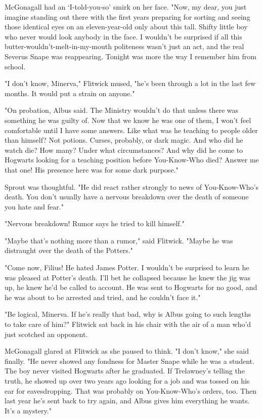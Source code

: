 McGonagall had an `I-told-you-so' smirk on her face. "Now, my dear, you just imagine standing out there with the first years preparing for sorting and seeing those identical eyes on an eleven-year-old only about this tall. Shifty little boy who never would look anybody in the face. I wouldn't be surprised if all this butter-wouldn't-melt-in-my-mouth politeness wasn't just an act, and the real Severus Snape was reappearing. Tonight was more the way I remember him from school.

"I don't know, Minerva," Flitwick mused, "he's been through a lot in the last few months. It would put a strain on anyone."

"On probation, Albus said. The Ministry wouldn't do that unless there was something he was guilty of. Now that we know he was one of them, I won't feel comfortable until I have some answers. Like what was he teaching to people older than himself? Not potions. Curses, probably, or dark magic. And who did he watch die? How many? Under what circumstances? And why did he come to Hogwarts looking for a teaching position before You-Know-Who died? Answer me that one! His presence here was for some dark purpose."

Sprout was thoughtful. "He did react rather strongly to news of You-Know-Who's death. You don't usually have a nervous breakdown over the death of someone you hate and fear."

"Nervous breakdown! Rumor says he tried to kill himself."

"Maybe that's nothing more than a rumor," said Flitwick. "Maybe he was distraught over the death of the Potters."

"Come now, Filius! He hated James Potter. I wouldn't be surprised to learn he was pleased at Potter's death. I'll bet he collapsed because he knew the jig was up, he knew he'd be called to account. He was sent to Hogwarts for no good, and he was about to be arrested and tried, and he couldn't face it."

"Be logical, Minerva. If he's really that bad, why is Albus going to such lengths to take care of him?" Flitwick sat back in his chair with the air of a man who'd just scotched an opponent.

McGonagall glared at Flitwick as she paused to think. "I don't know," she said finally. "He never showed any fondness for Master Snape while he was a student. The boy never visited Hogwarts after he graduated. If Trelawney's telling the truth, he showed up over two years ago looking for a job and was tossed on his ear for eavesdropping. That was probably on You-Know-Who's orders, too. Then last year he's sent back to try again, and Albus gives him everything he wants. It's a mystery."

